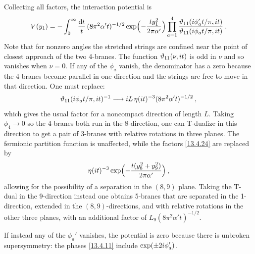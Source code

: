 Collecting all factors, the interaction potential is
\begin{equation}
	V(y_1) = -\int_0^\infty \frac{\mathrm{d} t}{t}\,(8\pi^2\alpha' t)^{-1/2}\exp\Bigl(-\frac{t y_1^2}{2\pi\alpha'}\Bigr)\prod_{a=1}^4 \frac{\vartheta_{11}(i\phi_a' t/\pi, i t)}{\vartheta_{11}(i\phi_a t/\pi, i t)} \:. \label{13.4.23}
\end{equation}
Note that for nonzero angles the stretched strings are confined near the point of closest approach of the two 4-branes. The function $\vartheta_{11}(\nu, i t)$ is odd in $\nu$ and so vanishes when $\nu = 0$. If any of the $\phi_a$ vanish, the denominator has a zero because the 4-branes become parallel in one direction and the strings are free to move in that direction. One must replace:
\begin{equation}
	\vartheta_{11}(i\phi_a t/\pi, i t)^{-1} \longrightarrow i L\,\eta(i t)^{-3}(8\pi^2\alpha' t)^{-1/2} \:, \label{13.4.24}
\end{equation}
which gives the usual factor for a noncompact direction of length $L$. Taking $\phi_4 \to 0$ so the 4-branes both run in the 8-direction, one can T-dualize in this direction to get a pair of 3-branes with relative rotations in three planes. The fermionic partition function is unaffected, while the factors \eqref{13.4.24} are replaced by
\begin{equation}
	\eta(i t)^{-3}\exp\Bigl(-\frac{t(y_8^2 + y_9^2)}{2\pi\alpha'}\Bigr) \:, \label{13.4.25}
\end{equation}
allowing for the possibility of a separation in the $(8,9)$ plane. Taking the T-dual in the 9-direction instead one obtains 5-branes that are separated in the 1-direction, extended in the $(8,9)$-directions, and with relative rotations in the other three planes, with an additional factor of $L_9(8\pi^2\alpha' t)^{-1/2}$.

If instead any of the $\phi_a'$ vanishes, the potential is zero because there is unbroken supersymmetry: the phases \eqref{13.4.11} include $\exp(\pm 2i\phi_a')$.

